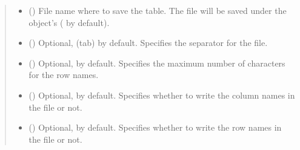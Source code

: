 \documentclass[letterpaper,10pt,english]{sphinxmanual}
\begin{document}
\begin{fulllineitems}
\begin{fulllineitems}
\begin{quote}
\begin{description}
\begin{itemize}
\item {} 
 () \textendash{} File name where to save the table. The file will be saved
under the object’s 
( by default).

\item {} 
 () \textendash{} Optional,  (tab) by default. Specifies the separator
for the file.

\item {} 
 () \textendash{} Optional,  by default. Specifies the maximum number
of characters for the row names.

\item {} 
 () \textendash{} Optional,  by default. Specifies whether to write
the column names in the file or not.

\item {} 
 () \textendash{} Optional,  by default. Specifies whether to write
the row names in the file or not.

\end{itemize}

\end{description}\end{quote}

\end{fulllineitems}


\end{fulllineitems}

\end{document}
